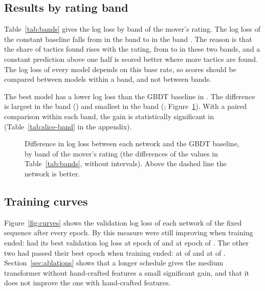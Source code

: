 \documentclass[11pt]{article}
\begin{document}
\subsection{Results by rating band}

Table~\ref{tab:bands} gives the log loss by band of the mover's rating. The
log loss of the constant baseline falls from  in the band
 to  in the band .\iflook{} The reason is that the share of tactics found
rises with the rating, from  to
 in these two bands, and a constant
prediction above one half is scored better where more tactics are found.\fi{}
The log loss of every model depends on this base rate, so scores should be
compared between models within a band, and not between bands.

\begin{table}[htbp]\centering\small
{}
\caption{Test log loss by band of the mover's rating. The share of tactics
found differs between bands, so values are comparable within a column and
not between columns.}
\label{tab:bands}
\end{table}

The best model has a lower log loss than the GBDT baseline in
. The difference is largest in the band
 () and smallest in the band
 (;
Figure~\ref{fig:bands}).\iflook{} With a paired comparison within each band,
the gain is statistically significant in 
(Table~\ref{tab:slice-band} in the appendix).\fi

\begin{figure}[htbp]\centering
{}
\caption{Difference in log loss between each network and the GBDT baseline,
by band of the mover's rating (the differences of the values in
Table~\ref{tab:bands}, without intervals). Above the dashed line the network
is better.}
\label{fig:bands}
\end{figure}

\subsection{Training curves}

Figure~\ref{fig:curves} shows the validation log loss of each network of the
fixed sequence after every epoch. By this measure
 were still improving when training ended:
 had its best validation log loss at epoch
 of  and
 at epoch  of
. The other two had passed their best epoch
when training ended:  at  of
 and  at
 of
.
\ifchangeepochs
Section~\ref{sec:ablations} shows that a longer schedule gives the medium
transformer without hand-crafted features a small significant gain, and that
it does not improve the one with hand-crafted features.
\fi
\end{document}
